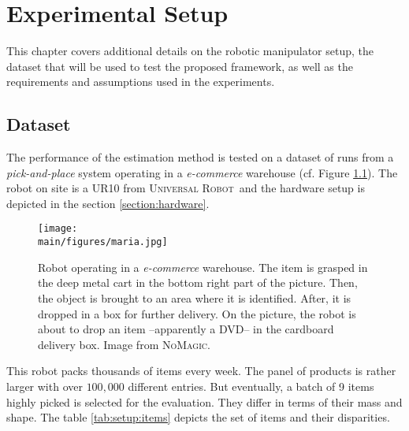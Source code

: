 \documentclass[/home/francois/latex/report/main.tex]{subfiles}
\begin{document}
\chapter{Experimental Setup}
\label{chapter:setup}

This chapter covers additional details on the robotic manipulator setup, the dataset that will be used to test the proposed framework, as well as the requirements and assumptions used in the experiments.

\section{Dataset}

The performance of the estimation method is tested on a dataset of runs from a \textit{pick-and-place} system operating in a \textit{e-commerce} warehouse (cf. Figure \ref{fig:setup:maria}). The robot on site is a UR10 from \textsc{Universal Robot}\texttrademark \ and the hardware setup is depicted in the section \ref{section:hardware}.

\begin{figure}[h]
  \centering
  \texttt{[image: \\main/figures/maria.jpg]}
  \caption{Robot operating in a \textit{e-commerce} warehouse. The item is grasped in the deep metal cart in the bottom right part of the picture. Then, the object is brought to an area where it is identified. After, it is dropped in a box for further delivery. On the picture, the robot is about to drop an item –apparently a DVD– in the cardboard delivery box. Image from \textsc{NoMagic}.}
  \label{fig:setup:maria}
\end{figure}

This robot packs thousands of items every week. The panel of products is rather larger with over $100{,}000$ different entries. But eventually, a batch of 9 items highly picked is selected for the evaluation. They differ in terms of their mass and shape. The table \ref{tab:setup:items} depicts the set of items and their disparities.
\end{document}
